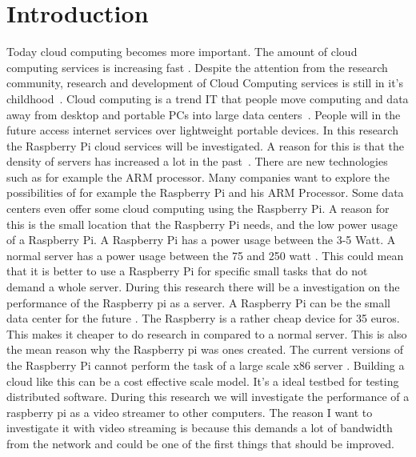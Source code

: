 \documentclass{sig-alternate-br}
\begin{document}

\section{Introduction}
Today cloud computing becomes more important. The amount of cloud computing services is increasing fast \cite{armbrust:2009}.  Despite the attention from the research community, research and development of Cloud Computing services is still in it's childhood~\cite{tso:2013}. 
Cloud computing is a trend IT that people move computing and data away from desktop and portable PCs into large data centers~\cite{dikaiakos:2009}. People will in the future access internet services over lightweight portable devices. In this research the Raspberry Pi cloud services will be investigated. A reason for this is that the density of servers has increased a lot in the past~\cite{density}. There are new technologies such as for example the ARM processor. Many companies want to explore the possibilities of for example the Raspberry Pi and his ARM Processor. Some data centers even offer some cloud computing using the Raspberry Pi. A reason for this is the small location that the Raspberry Pi needs, and the low power usage of a Raspberry Pi\cite{hosting,Pcextreme}.  A Raspberry Pi has a power usage between the 3-5 Watt. A normal server has a power usage between the 75 and 250 watt \cite{Powerusage,beloglazov2012energy}. This could mean that it is better to use a Raspberry Pi for specific small tasks that do not demand a whole server. During this research there will be a investigation on the performance of the Raspberry pi as a server.  A Raspberry Pi can be the small data center for the future \cite{tso:2013}. The Raspberry is a rather cheap device for 35 euros. This makes it cheaper to do research in compared to a normal server. This is also the mean reason why the Raspberry pi was ones created. The current versions of the Raspberry Pi cannot perform the task of a large scale x86 server \cite{tso:2013}. Building a cloud like this can be a cost effective scale model\cite{tso:2013}. It's a ideal testbed for testing distributed software. During this research we will investigate the performance of a raspberry pi as a video streamer to other computers. The reason I want to investigate it with video streaming is because this demands a lot of bandwidth from the network and could be one of the first things that should be improved. 
\end{document}

